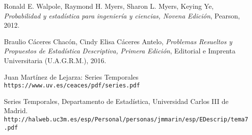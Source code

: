 

\begin{thebibliography}{9}
Ronald E. Walpole, Raymond H. Myers, Sharon L. Myers, Keying Ye, \textit{Probabilidad y estadística para ingeniería y ciencias, Novena Edición}, Pearson, 2012. 
 
Braulio Cáceres Chacón, Cindy Elisa Cáceres Antelo, \textit{Problemas Resueltos y Propuestos de Estadística Descriptiva, Primera Edición}, Editorial e Imprenta Universitaria (U.A.G.R.M.), 2016.

 
Juan Martínez de Lejarza: Series Temporales
\\\texttt{https://www.uv.es/ceaces/pdf/series.pdf}

Series Temporales, Departamento de Estadística, Universidad Carlos III de Madrid.
\\\texttt{http://halweb.uc3m.es/esp/Personal/personas/jmmarin/esp/EDescrip/tema7.pdf}

\end{thebibliography}


